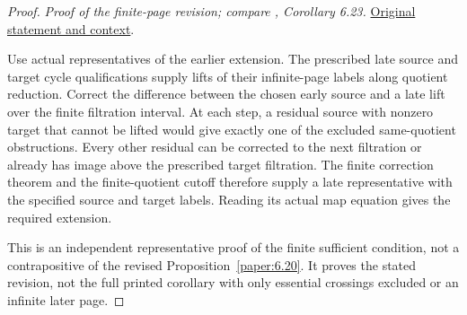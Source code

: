 \begin{proof}
\textit{Proof of the finite-page revision; compare \cite{LWX126}, Corollary 6.23.} \href{paper/main.tex.html#L2074}{Original statement and context}.

Use actual representatives of the earlier extension. The prescribed late source and target cycle qualifications supply lifts of their infinite-page labels along quotient reduction. Correct the difference between the chosen early source and a late lift over the finite filtration interval. At each step, a residual source with nonzero target that cannot be lifted would give exactly one of the excluded same-quotient obstructions. Every other residual can be corrected to the next filtration or already has image above the prescribed target filtration. The finite correction theorem and the finite-quotient cutoff therefore supply a late representative with the specified source and target labels. Reading its actual map equation gives the required extension.

This is an independent representative proof of the finite sufficient condition, not a contrapositive of the revised Proposition~\ref{paper:6.20}. It proves the stated revision, not the full printed corollary with only essential crossings excluded or an infinite later page.
\end{proof}
